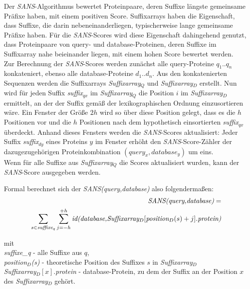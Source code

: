 \documentclass{article}
\begin{document}
Der \emph{SANS}-Algorithmus bewertet Proteinpaare, deren Suffixe längste gemeinsame
Präfixe haben, mit einem positiven Score. Suffixarrays haben die Eigenschaft,
dass Suffixe, die darin nebeneinanderliegen, typischerweise lange
gemeinsame Präfixe haben. Für die  \emph{SANS}-Scores wird diese Eigenschaft dahingehend
genutzt, dass Proteinpaare von query- und database-Proteinen, deren Suffixe im
Suffixarray nahe beieinander liegen, mit einem hohen Score bewertet werden.\\
Zur Berechnung der  \emph{SANS}-Scores werden zunächst alle query-Proteine $q_1..q_n$ konkateniert, ebenso alle database-Proteine $d_1..d_n$. 
Aus den konkatenierten Sequenzen werden die Suffixarrays \emph{Suffixarray$_Q$} und \emph{Suffixarray$_D$} erstellt. 
Nun wird für jeden Suffix \emph{suffix$_{qx}$} im \emph{Suffixarray$_Q$} die
Position $i$ im \emph{Suffixarray$_D$} ermittelt, an der der Suffix gemäß der lexikographischen Ordnung einzusortieren wäre. 
Ein Fenster der Größe $2h$ wird so über diese Position gelegt, dass es die $h$
Positionen vor und die $h$ Positionen nach dem hypothetisch einsortierten
\emph{suffix$_{qx}$} überdeckt. 
Anhand dieses Fensters werden die \emph{SANS}-Scores aktualisiert: 
Jeder Suffix \emph{suffix$_{dy}$} eines Proteins $y$ im Fenster erhöht den  \emph{SANS}-Score-Zähler der dazugezugehörigen Proteinkombination $(query_x,database_y)$ um eins. \\
Wenn für alle Suffixe aus \emph{Suffixarray$_Q$} die Scores aktualisiert wurden, kann der  \emph{SANS}-Score ausgegeben werden.

Formal berechnet sich der \emph{SANS(query,database)} also folgendermaßen:\\

\begin{equation*}
  \begin{split}
\text{\emph{SANS(query,database)}} = \\ \sum_{s \in \text{\emph{suffixe$_q$}}} \sum_{j=-h}^{+h} \text{\emph{id(database,Suffixarray$_D[$position$_D(s)  +j]$.protein)}} 
  \end{split}
\end{equation*}

mit\\
\hspace{1pc} \emph{suffixe\_q} - alle Suffixe aus $q$,\\
\hspace{1pc} \emph{position$_D$(s)} - theoretische Position des Suffixes $s$ in \emph{Suffixarray$_D$} \\
\hspace{1pc} \emph{Suffixarray$_D[x]$.protein} - database-Protein, zu dem der Suffix an der Position $x$ des \emph{Suffixarray$_D$} gehört. \\
\end{document}
